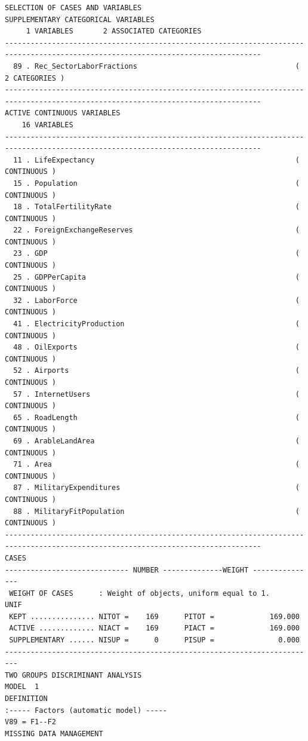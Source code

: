 \documentclass[a4paper,10pt,twocolumn]{article}
\begin{document}
\begin{landscape}
\begin{verbatim}
SELECTION OF CASES AND VARIABLES
SUPPLEMENTARY CATEGORICAL VARIABLES
     1 VARIABLES       2 ASSOCIATED CATEGORIES
----------------------------------------------------------------------------------------------------------------------------------
  89 . Rec_SectorLaborFractions                                     (   2 CATEGORIES )
----------------------------------------------------------------------------------------------------------------------------------
ACTIVE CONTINUOUS VARIABLES
    16 VARIABLES
----------------------------------------------------------------------------------------------------------------------------------
  11 . LifeExpectancy                                               ( CONTINUOUS )
  15 . Population                                                   ( CONTINUOUS )
  18 . TotalFertilityRate                                           ( CONTINUOUS )
  22 . ForeignExchangeReserves                                      ( CONTINUOUS )
  23 . GDP                                                          ( CONTINUOUS )
  25 . GDPPerCapita                                                 ( CONTINUOUS )
  32 . LaborForce                                                   ( CONTINUOUS )
  41 . ElectricityProduction                                        ( CONTINUOUS )
  48 . OilExports                                                   ( CONTINUOUS )
  52 . Airports                                                     ( CONTINUOUS )
  57 . InternetUsers                                                ( CONTINUOUS )
  65 . RoadLength                                                   ( CONTINUOUS )
  69 . ArableLandArea                                               ( CONTINUOUS )
  71 . Area                                                         ( CONTINUOUS )
  87 . MilitaryExpenditures                                         ( CONTINUOUS )
  88 . MilitaryFitPopulation                                        ( CONTINUOUS )
----------------------------------------------------------------------------------------------------------------------------------
CASES
----------------------------- NUMBER --------------WEIGHT ---------------
 WEIGHT OF CASES      : Weight of objects, uniform equal to 1.                  UNIF
 KEPT ............... NITOT =    169      PITOT =             169.000
 ACTIVE ............. NIACT =    169      PIACT =             169.000
 SUPPLEMENTARY ...... NISUP =      0      PISUP =               0.000
-------------------------------------------------------------------------
TWO GROUPS DISCRIMINANT ANALYSIS
MODEL  1
DEFINITION
:----- Factors (automatic model) -----
V89 = F1--F2
MISSING DATA MANAGEMENT


\end{verbatim}
\end{landscape}
\end{document}

